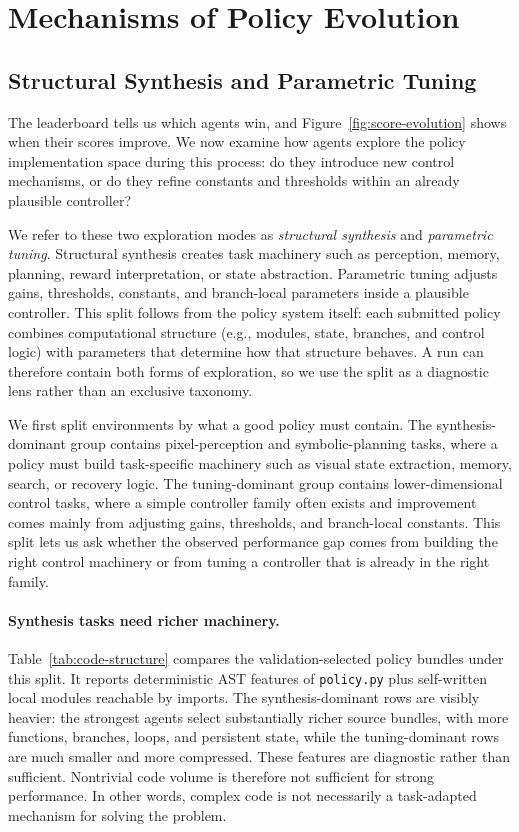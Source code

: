 \section{Mechanisms of Policy Evolution}
\label{sec:behavior-analysis}

\subsection{Structural Synthesis and Parametric Tuning}
\label{sec:two-aspects}

The leaderboard tells us which agents win, and
Figure~\ref{fig:score-evolution} shows when their scores improve. We now examine how agents explore the policy implementation space during this process: do they introduce new control mechanisms, or do they refine constants and thresholds within an already plausible controller?

We refer to these two exploration modes as \emph{structural synthesis} and
\emph{parametric tuning}. Structural synthesis creates task machinery such as
perception, memory, planning, reward interpretation, or state abstraction.
Parametric tuning adjusts gains, thresholds, constants, and branch-local
parameters inside a plausible controller. This split follows from the policy
system itself: each submitted policy combines computational structure
(e.g., modules, state, branches, and control logic) with parameters that determine
how that structure behaves. A run can therefore contain both forms of
exploration, so we use the split as a diagnostic lens rather than an exclusive
taxonomy.

We first split environments by what a good policy must contain. The
synthesis-dominant group contains pixel-perception and symbolic-planning tasks,
where a policy must build task-specific machinery such as visual state
extraction, memory, search, or recovery logic. The tuning-dominant group
contains lower-dimensional control tasks, where a simple controller family
often exists and improvement comes mainly from adjusting gains, thresholds, and
branch-local constants. This split lets us ask whether the observed performance
gap comes from building the right control machinery or from tuning a controller
that is already in the right family.



\paragraph{Synthesis tasks need richer machinery.}
Table~\ref{tab:code-structure} compares the validation-selected policy bundles
under this split. It reports deterministic AST features of \texttt{policy.py}
plus self-written local modules reachable by imports. The synthesis-dominant
rows are visibly heavier: the strongest agents select substantially richer
source bundles, with more functions, branches, loops, and persistent state,
while the tuning-dominant rows are much smaller and more compressed.
These features are diagnostic rather than sufficient. 
Nontrivial code volume is therefore not sufficient for strong performance. In other words, complex code is not necessarily a task-adapted mechanism for solving the problem.

